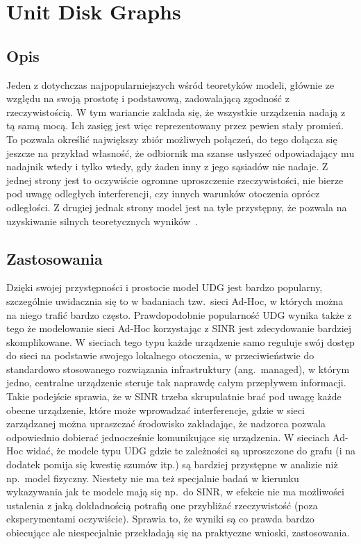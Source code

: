 \documentclass[11pt,a4paper,onecolumn,twoside]{mwart}
\begin{document}
\section{Unit Disk Graphs}
\subsection{Opis}
Jeden z dotychczas najpopularniejszych wśród teoretyków modeli, głównie ze
względu na swoją prostotę i podstawową, zadowalającą zgodność z rzeczywistością.
W tym wariancie zakłada się, że wszystkie urządzenia nadają z tą samą mocą. Ich
zasięg jest więc reprezentowany przez pewien stały promień. To pozwala określić
największy zbiór możliwych połączeń, do tego dołącza się jeszcze na przykład
własność, że odbiornik ma szanse usłyszeć odpowiadający mu nadajnik wtedy
i tylko wtedy, gdy żaden inny z jego sąsiadów nie nadaje. Z jednej strony jest
to oczywiście ogromne uproszczenie rzeczywistości, nie bierze pod uwagę
odległych interferencji, czy innych warunków otoczenia oprócz
odległości. Z drugiej jednak strony model jest na tyle przystępny, że pozwala na
uzyskiwanie silnych teoretycznych wyników~\cite{Alzoubi:2002:MCD:513800.513820,
Kuhn:2002:AOG:570810.570814}.

\subsection{Zastosowania}
Dzięki swojej przystępności i prostocie model UDG jest bardzo popularny,
szczególnie uwidacznia się to w badaniach tzw.\ sieci Ad-Hoc, w których można
na niego trafić bardzo często. Prawdopodobnie popularność UDG wynika także
z tego że modelowanie sieci Ad-Hoc korzystając z SINR jest zdecydowanie bardziej
skomplikowane. W sieciach tego typu każde urządzenie samo reguluje swój dostęp
do sieci na podstawie swojego lokalnego otoczenia, w przeciwieństwie do
standardowo stosowanego rozwiązania infrastruktury (ang.\ managed), w którym
jedno, centralne urządzenie steruje tak naprawdę całym przepływem informacji.
Takie podejście sprawia, że w SINR trzeba skrupulatnie brać pod uwagę każde
obecne urządzenie, które może wprowadzać interferencje, gdzie w sieci
zarządzanej można upraszczać środowisko zakładając, że nadzorca pozwala
odpowiednio dobierać jednocześnie komunikujące się urządzenia. W sieciach Ad-Hoc
widać, że modele typu UDG gdzie te zależności są uproszczone do grafu
(i na dodatek pomija się kwestię szumów itp.) są bardziej przystępne w analizie
niż np.\ model fizyczny. Niestety nie ma też specjalnie badań w kierunku
wykazywania jak te modele mają się np.\ do SINR, w efekcie nie ma możliwości
ustalenia z jaką dokładnością potrafią one przybliżać rzeczywistość
(poza eksperymentami oczywiście). Sprawia to, że wyniki są co prawda bardzo
obiecujące ale niespecjalnie przekładają się na praktyczne wnioski,
zastosowania.
\end{document}
